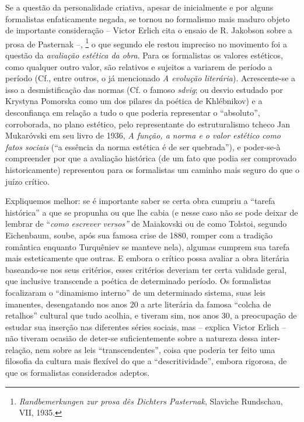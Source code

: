 Se a questão da personalidade criativa, apesar de inicialmente e por
alguns formalistas enfaticamente negada, se tornou no formalismo mais
maduro objeto de importante consideração -- Victor Erlich cita o ensaio
de R. Jakobson sobre a prosa de Pasternak --, \footnote{\emph{Randbemerkungen
  zur prosa dês Dichters Pasternak}, Slaviche Rundschau, VII, 1935.} o
que segundo ele restou impreciso no movimento foi a questão da
\emph{avaliação estética da obra}. Para os formalistas os valores
estéticos, como qualquer outro valor, são relativos e sujeitos a
variarem de período a período (Cf., entre outros, o já mencionado
\emph{A evolução literária}). Acrescente-se a isso a desmistificação das
normas (Cf. o famoso \emph{sdvig}; ou desvio estudado por Krystyna
Pomorska como um dos pilares da poética de Khlébnikov) e a desconfiança
em relação a tudo o que poderia representar o ``absoluto'', corroborada,
no plano estético, pelo representante do estruturalismo tcheco Jan
Mukaróvski em seu livro de 1936, \emph{A função, a norma e o valor
estético como fatos sociais} (``a essência da norma estética é de ser
quebrada''), e poder-se-à compreender por que a avaliação histórica (de
um fato que podia ser comprovado historicamente) representou para os
formalistas um caminho mais seguro do que o juízo crítico.

Expliquemos melhor: se é importante saber se certa obra cumpriu a
``tarefa histórica'' a que se propunha ou que lhe cabia (e nesse caso
não se pode deixar de lembrar de ``\emph{como escrever versos''} de
Maiakovski ou de como Tolstoi, segundo Eichenbaum, soube, após sua
famosa crise de 1880, romper com a tradição romântica enquanto
Turquêniev se manteve nela), algumas cumprem sua tarefa mais
esteticamente que outras. E embora o crítico possa avaliar a obra
literária baseando-se nos seus critérios, esses critérios deveriam ter
certa validade geral, que inclusive transcende a poética de determinado
período. Os formalistas focalizaram o ``dinamismo interno'' de um
determinado sistema, suas leis imanentes, desengatando nos anos 20 a
arte literária da famosa ``colcha de retalhos'' cultural que tudo
acolhia, e tiveram sim, nos anos 30, a preocupação de estudar sua
inserção nas diferentes séries sociais, mas -- explica Victor Erlich --
não tiveram ocasião de deter-se suficientemente sobre a natureza dessa
inter-relação, nem sobre as leis ``transcendentes'', coisa que poderia
ter feito uma filosofia da cultura mais flexível do que a
``descritividade'', embora rigorosa, de que os formalistas considerados
adeptos.

